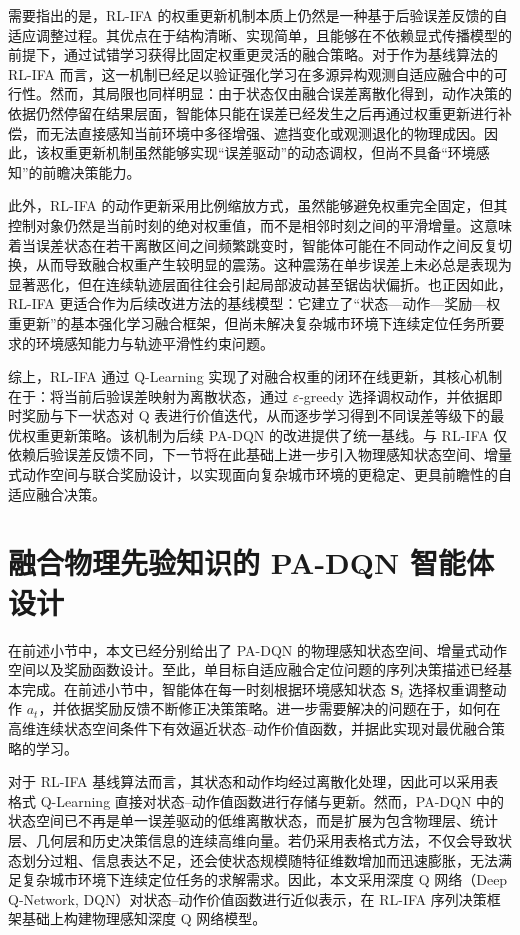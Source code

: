 需要指出的是，RL-IFA 的权重更新机制本质上仍然是一种基于后验误差反馈的自适应调整过程。其优点在于结构清晰、实现简单，且能够在不依赖显式传播模型的前提下，通过试错学习获得比固定权重更灵活的融合策略。对于作为基线算法的 RL-IFA 而言，这一机制已经足以验证强化学习在多源异构观测自适应融合中的可行性。然而，其局限也同样明显：由于状态仅由融合误差离散化得到，动作决策的依据仍然停留在结果层面，智能体只能在误差已经发生之后再通过权重更新进行补偿，而无法直接感知当前环境中多径增强、遮挡变化或观测退化的物理成因。因此，该权重更新机制虽然能够实现“误差驱动”的动态调权，但尚不具备“环境感知”的前瞻决策能力。

此外，RL-IFA 的动作更新采用比例缩放方式，虽然能够避免权重完全固定，但其控制对象仍然是当前时刻的绝对权重值，而不是相邻时刻之间的平滑增量。这意味着当误差状态在若干离散区间之间频繁跳变时，智能体可能在不同动作之间反复切换，从而导致融合权重产生较明显的震荡。这种震荡在单步误差上未必总是表现为显著恶化，但在连续轨迹层面往往会引起局部波动甚至锯齿状偏折。也正因如此，RL-IFA 更适合作为后续改进方法的基线模型：它建立了“状态—动作—奖励—权重更新”的基本强化学习融合框架，但尚未解决复杂城市环境下连续定位任务所要求的环境感知能力与轨迹平滑性约束问题。

综上，RL-IFA 通过 Q-Learning 实现了对融合权重的闭环在线更新，其核心机制在于：将当前后验误差映射为离散状态，通过 \(\varepsilon\)-greedy 选择调权动作，并依据即时奖励与下一状态对 Q 表进行价值迭代，从而逐步学习得到不同误差等级下的最优权重更新策略。该机制为后续 PA-DQN 的改进提供了统一基线。与 RL-IFA 仅依赖后验误差反馈不同，下一节将在此基础上进一步引入物理感知状态空间、增量式动作空间与联合奖励设计，以实现面向复杂城市环境的更稳定、更具前瞻性的自适应融合决策。

\section{融合物理先验知识的 PA-DQN 智能体设计}

在前述小节中，本文已经分别给出了 PA-DQN 的物理感知状态空间、增量式动作空间以及奖励函数设计。至此，单目标自适应融合定位问题的序列决策描述已经基本完成。在前述小节中，智能体在每一时刻根据环境感知状态 \(\mathbf{S}_t\) 选择权重调整动作 \(a_t\)，并依据奖励反馈不断修正决策策略。进一步需要解决的问题在于，如何在高维连续状态空间条件下有效逼近状态--动作价值函数，并据此实现对最优融合策略的学习。

对于 RL-IFA 基线算法而言，其状态和动作均经过离散化处理，因此可以采用表格式 Q-Learning 直接对状态--动作值函数进行存储与更新。然而，PA-DQN 中的状态空间已不再是单一误差驱动的低维离散状态，而是扩展为包含物理层、统计层、几何层和历史决策信息的连续高维向量。若仍采用表格式方法，不仅会导致状态划分过粗、信息表达不足，还会使状态规模随特征维数增加而迅速膨胀，无法满足复杂城市环境下连续定位任务的求解需求。因此，本文采用深度 Q 网络（Deep Q-Network, DQN）对状态--动作价值函数进行近似表示，在 RL-IFA 序列决策框架基础上构建物理感知深度 Q 网络模型。
